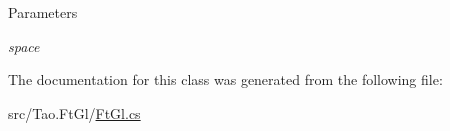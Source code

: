 \begin{DoxyParams}{Parameters}
\item[{\em space}]\end{DoxyParams}


The documentation for this class was generated from the following file:\begin{DoxyCompactItemize}
\item 
src/Tao.FtGl/\hyperlink{_ft_gl_8cs}{FtGl.cs}\end{DoxyCompactItemize}
